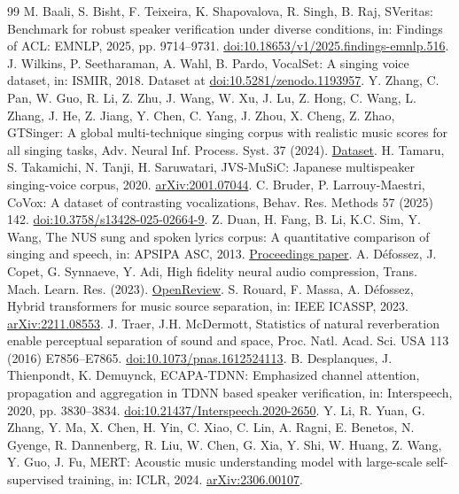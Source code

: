 \documentclass[10pt,a4paper]{article}
\begin{document}
\begin{thebibliography}{99}
 M. Baali, S. Bisht, F. Teixeira, K. Shapovalova, R. Singh, B. Raj, SVeritas: Benchmark for robust speaker verification under diverse conditions, in: Findings of ACL: EMNLP, 2025, pp. 9714--9731. \href{https://doi.org/10.18653/v1/2025.findings-emnlp.516}{doi:10.18653/v1/2025.findings-emnlp.516}.
 J. Wilkins, P. Seetharaman, A. Wahl, B. Pardo, VocalSet: A singing voice dataset, in: ISMIR, 2018. Dataset at \href{https://doi.org/10.5281/zenodo.1193957}{doi:10.5281/zenodo.1193957}.
 Y. Zhang, C. Pan, W. Guo, R. Li, Z. Zhu, J. Wang, W. Xu, J. Lu, Z. Hong, C. Wang, L. Zhang, J. He, Z. Jiang, Y. Chen, C. Yang, J. Zhou, X. Cheng, Z. Zhao, GTSinger: A global multi-technique singing corpus with realistic music scores for all singing tasks, Adv. Neural Inf. Process. Syst. 37 (2024). \href{https://huggingface.co/datasets/GTSinger/GTSinger}{Dataset}.
 H. Tamaru, S. Takamichi, N. Tanji, H. Saruwatari, JVS-MuSiC: Japanese multispeaker singing-voice corpus, 2020. \href{https://arxiv.org/abs/2001.07044}{arXiv:2001.07044}.
 C. Bruder, P. Larrouy-Maestri, CoVox: A dataset of contrasting vocalizations, Behav. Res. Methods 57 (2025) 142. \href{https://doi.org/10.3758/s13428-025-02664-9}{doi:10.3758/s13428-025-02664-9}.
 Z. Duan, H. Fang, B. Li, K.C. Sim, Y. Wang, The NUS sung and spoken lyrics corpus: A quantitative comparison of singing and speech, in: APSIPA ASC, 2013. \href{https://apsipa.com/proceedings/2013/papers/364_NUS-corpus-Duan-2927261.pdf}{Proceedings paper}.
 A. D\'efossez, J. Copet, G. Synnaeve, Y. Adi, High fidelity neural audio compression, Trans. Mach. Learn. Res. (2023). \href{https://openreview.net/forum?id=ivCd8z8zR2}{OpenReview}.
 S. Rouard, F. Massa, A. D\'efossez, Hybrid transformers for music source separation, in: IEEE ICASSP, 2023. \href{https://arxiv.org/abs/2211.08553}{arXiv:2211.08553}.
 J. Traer, J.H. McDermott, Statistics of natural reverberation enable perceptual separation of sound and space, Proc. Natl. Acad. Sci. USA 113 (2016) E7856--E7865. \href{https://doi.org/10.1073/pnas.1612524113}{doi:10.1073/pnas.1612524113}.
 B. Desplanques, J. Thienpondt, K. Demuynck, ECAPA-TDNN: Emphasized channel attention, propagation and aggregation in TDNN based speaker verification, in: Interspeech, 2020, pp. 3830--3834. \href{https://doi.org/10.21437/Interspeech.2020-2650}{doi:10.21437/Interspeech.2020-2650}.
 Y. Li, R. Yuan, G. Zhang, Y. Ma, X. Chen, H. Yin, C. Xiao, C. Lin, A. Ragni, E. Benetos, N. Gyenge, R. Dannenberg, R. Liu, W. Chen, G. Xia, Y. Shi, W. Huang, Z. Wang, Y. Guo, J. Fu, MERT: Acoustic music understanding model with large-scale self-supervised training, in: ICLR, 2024. \href{https://arxiv.org/abs/2306.00107}{arXiv:2306.00107}.

\end{thebibliography}
\end{document}
